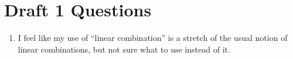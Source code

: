 \documentclass[a4paper, 10pt]{article}
\begin{document}


\section{Draft 1 Questions}
\begin{enumerate}
    \item I feel like my use of ``linear combination'' is a stretch of the usual notion of linear combinations, but not sure what to use instead of it.
\end{enumerate}
\end{document}
